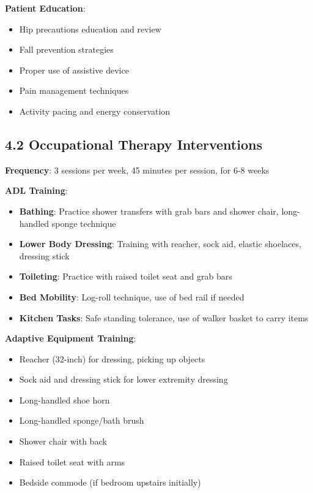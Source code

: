 \documentclass[11pt,letterpaper]{article}
\begin{document}
\textbf{Patient Education}:
\begin{itemize}[leftmargin=*]
    \item Hip precautions education and review
    \item Fall prevention strategies
    \item Proper use of assistive device
    \item Pain management techniques
    \item Activity pacing and energy conservation
\end{itemize}

\subsection*{4.2 Occupational Therapy Interventions}

\textbf{Frequency}: 3 sessions per week, 45 minutes per session, for 6-8 weeks

\textbf{ADL Training}:
\begin{itemize}[leftmargin=*]
    \item \textbf{Bathing}: Practice shower transfers with grab bars and shower chair, long-handled sponge technique
    \item \textbf{Lower Body Dressing}: Training with reacher, sock aid, elastic shoelaces, dressing stick
    \item \textbf{Toileting}: Practice with raised toilet seat and grab bars
    \item \textbf{Bed Mobility}: Log-roll technique, use of bed rail if needed
    \item \textbf{Kitchen Tasks}: Safe standing tolerance, use of walker basket to carry items
\end{itemize}

\textbf{Adaptive Equipment Training}:
\begin{itemize}[leftmargin=*]
    \item Reacher (32-inch) for dressing, picking up objects
    \item Sock aid and dressing stick for lower extremity dressing
    \item Long-handled shoe horn
    \item Long-handled sponge/bath brush
    \item Shower chair with back
    \item Raised toilet seat with arms
    \item Bedside commode (if bedroom upstairs initially)
\end{itemize}
\end{document}
